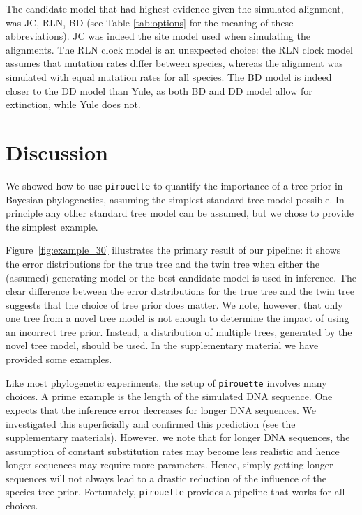 The candidate model that had highest evidence given the simulated alignment,
was JC, RLN, BD (see Table \ref{tab:options} for the meaning of these 
abbreviations). JC was indeed the site model used when simulating the
alignments. The RLN clock model is an unexpected choice: the RLN clock
model assumes that mutation rates differ between species, whereas the
alignment was simulated with equal mutation rates for all species.
The BD model is indeed closer to the DD model than Yule, as both BD and DD
model allow for extinction, while Yule does not.

\section{Discussion}

We showed how to use \verb;pirouette; to quantify the importance of a 
tree prior in Bayesian phylogenetics, assuming the simplest standard 
tree model possible.
In principle any other standard tree model can be assumed, 
but we chose to provide the simplest example.

Figure~\ref{fig:example_30} illustrates the primary result of our pipeline: 
it shows the error distributions for the true tree and the twin tree 
when either the (assumed) generating model or the best candidate model is used in inference. 
The clear difference between the error distributions 
for the true tree and the twin tree suggests 
that the choice of tree prior does matter.
We note, however, that only one tree from a novel tree model
is not enough to determine the impact of using an incorrect
tree prior. Instead, a distribution 
of multiple trees, generated by the novel tree model, should be used. In the supplementary material we have provided some examples.

Like most phylogenetic experiments, the setup of \verb;pirouette;
involves many choices. A prime example is the
length of the simulated DNA sequence. One expects that the inference error
decreases for longer DNA sequences. We investigated this
superficially and confirmed this prediction (see the supplementary materials). However, we note that for longer DNA sequences, the assumption of constant substitution rates may become less realistic and hence longer sequences may require more parameters. Hence, simply getting longer sequences will not always lead to a drastic reduction of the influence of the species tree prior.
Fortunately, \verb;pirouette; provides a pipeline that works for all choices.

